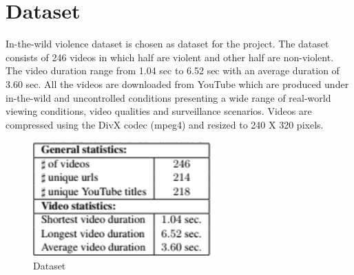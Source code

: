\chapter{Dataset}
In-the-wild violence dataset is chosen as dataset for the project. The dataset consists of 246 videos in which half are violent and other half are non-violent. The video duration range from 1.04 sec to 6.52 sec with an average duration of 3.60 sec. All the videos are downloaded from YouTube which are produced under in-the-wild and uncontrolled conditions presenting a wide range of real-world viewing conditions, video qualities and surveillance scenarios. Videos are compressed using the DivX codec (mpeg4) and resized to 240 X 320 pixels.

\begin{center}
\begin{figure}[H]
\centering
\includegraphics{dataset.png}
\caption{Dataset}
\end{figure}
\end{center}